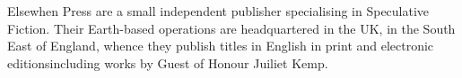 Elsewhen Press are a small independent publisher specialising in
Speculative Fiction. Their Earth-based operations are headquartered in
the UK, in the South East of England, whence they publish titles in
English in print and electronic editions\textemdash including works
by Guest of Honour Juiliet Kemp.
